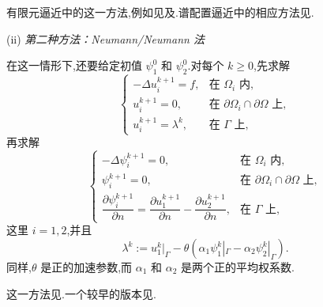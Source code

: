 有限元逼近中的这一方法,例如见及.谱配置逼近中的相应方法见.

\medskip
\noindent (ii) \emph{第二种方法：Neumann/Neumann 法}\par
在这一情形下,还要给定初值 \(\psi_1^0\) 和 \(\psi_2^0\).对每个 \(k\ge0\),先求解
\begin{equation}\label{eq:6.4.21}
  \begin{cases}
    -\Delta u_i^{k+1}=f,&\text{在 }\Omega_i\text{ 内},\\
    u_i^{k+1}=0,&\text{在 }\partial\Omega_i\cap\partial\Omega\text{ 上},\\
    u_i^{k+1}=\lambda^k,&\text{在 }\Gamma\text{ 上},
  \end{cases}
\end{equation}
再求解
\begin{equation}\label{eq:6.4.22}
  \begin{cases}
    -\Delta\psi_i^{k+1}=0,&\text{在 }\Omega_i\text{ 内},\\
    \psi_i^{k+1}=0,&\text{在 }\partial\Omega_i\cap\partial\Omega\text{ 上},\\
    \dfrac{\partial\psi_i^{k+1}}{\partial n}
      =\dfrac{\partial u_1^{k+1}}{\partial n}-\dfrac{\partial u_2^{k+1}}{\partial n},
        &\text{在 }\Gamma\text{ 上},
  \end{cases}
\end{equation}
这里 \(i=1,2\),并且
\begin{equation}\label{eq:6.4.23}
  \lambda^k:=u_1^k|_\Gamma-\theta(\alpha_1\psi_1^k|_\Gamma-\alpha_2\psi_2^k|_\Gamma).
\end{equation}
同样,\(\theta\) 是正的加速参数,而 \(\alpha_1\) 和 \(\alpha_2\) 是两个正的平均权系数.

这一方法见.一个较早的版本见.

